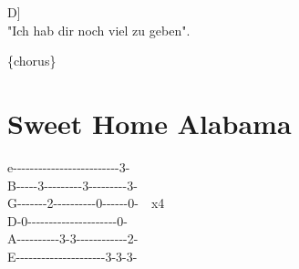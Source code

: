 \documentclass[
  letterpaper,
  a5paper]{memoir}
\begin{document}
\hspace*{0.333em}\hspace*{0.333em}\hspace*{0.333em}\hspace*{0.333em}\hspace*{0.333em}\hspace*{0.333em}\hspace*{0.333em}\hspace*{0.333em}\hspace*{0.333em}\hspace*{0.333em}\hspace*{0.333em}\hspace*{0.333em}\hspace*{0.333em}\hspace*{0.333em}\hspace*{0.333em}\hspace*{0.333em}\hspace*{0.333em}\hspace*{0.333em}\hspace*{0.333em}\hspace*{0.333em}\hspace*{0.333em}\hspace*{0.333em}\hspace*{0.333em}\hspace*{0.333em}\hspace*{0.333em}\hspace*{0.333em}\hspace*{0.333em}{[}D{]}\\
"Ich hab dir noch viel zu geben".

\{chorus\}

\hypertarget{sweet-home-alabama}{%
\chapter{Sweet Home Alabama}\label{sweet-home-alabama}}

e\textbar-\/-\/-\/-\/-\/-\/-\/-\/-\/-\/-\/-\/-\/-\/-\/-\/-\/-\/-\/-\/-\/-\/-\/-\/-3-\textbar{}\\
B\textbar-\/-\/-\/-\/-3-\/-\/-\/-\/-\/-\/-\/-\/-3-\/-\/-\/-\/-\/-\/-\/-\/-3-\textbar{}\\
G\textbar-\/-\/-\/-\/-\/-\/-2-\/-\/-\/-\/-\/-\/-\/-\/-\/-0-\/-\/-\/-\/-\/-0-\textbar~~x4\\
D-0-\/-\/-\/-\/-\/-\/-\/-\/-\/-\/-\/-\/-\/-\/-\/-\/-\/-\/-\/-\/-0-\textbar~~~~~\\
A\textbar-\/-\/-\/-\/-\/-\/-\/-\/-\/-3-3-\/-\/-\/-\/-\/-\/-\/-\/-\/-\/-\/-2-\textbar{}\\
E\textbar-\/-\/-\/-\/-\/-\/-\/-\/-\/-\/-\/-\/-\/-\/-\/-\/-\/-\/-\/-\/-3-3-3-\textbar{}
\end{document}
